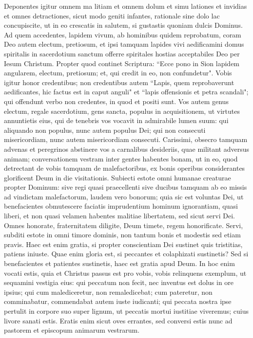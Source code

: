 \begin{biblechapter}  
\verse Deponentes igitur omnem ma litiam et omnem dolum et simu lationes et invidias et omnes detractiones, 
\verse sicut modo geniti infantes, rationale sine dolo lac concupiscite, ut in eo crescatis in salutem, 
\verse si gustastis quoniam dulcis Dominus. 
\verse Ad quem accedentes, lapidem vivum, ab hominibus quidem reprobatum, coram Deo autem electum, pretiosum, 
\verse et ipsi tamquam lapides vivi aedificamini domus spiritalis in sacerdotium sanctum offerre spiritales hostias acceptabiles Deo per Iesum Christum. 
\verse Propter quod continet Scriptura: “Ecce pono in Sion lapidem angularem, electum, pretiosum; et, qui credit in eo, non confundetur". 
\verse Vobis igitur honor credentibus; non credentibus autem “Lapis, quem reprobaverunt aedificantes, hic factus est in caput anguli" 
\verse et “lapis offensionis et petra scandali"; qui offendunt verbo non credentes, in quod et positi sunt. 
\verse Vos autem genus electum, regale sacerdotium, gens sancta, populus in acquisitionem, ut virtutes annuntietis eius, qui de tenebris vos vocavit in admirabile lumen suum: 
\verse qui aliquando non populus, nunc autem populus Dei; qui non consecuti misericordiam, nunc autem misericordiam consecuti. 
\verse Carissimi, obsecro tamquam advenas et peregrinos abstinere vos a carnalibus desideriis, quae militant adversus animam; 
\verse conversationem vestram inter gentes habentes bonam, ut in eo, quod detrectant de vobis tamquam de malefactoribus, ex bonis operibus considerantes glorificent Deum in die visitationis. 
\verse Subiecti estote omni humanae creaturae propter Dominum: sive regi quasi praecellenti 
\verse sive ducibus tamquam ab eo missis ad vindictam malefactorum, laudem vero bonorum; 
\verse quia sic est voluntas Dei, ut benefacientes obmutescere faciatis imprudentium hominum ignorantiam, 
\verse quasi liberi, et non quasi velamen habentes malitiae libertatem, sed sicut servi Dei. 
\verse Omnes honorate, fraternitatem diligite, Deum timete, regem honorificate. 
\verse Servi, subditi estote in omni timore dominis, non tantum bonis et modestis sed etiam pravis. 
\verse Haec est enim gratia, si propter conscientiam Dei sustinet quis tristitias, patiens iniuste. 
\verse Quae enim gloria est, si peccantes et colaphizati sustinetis? Sed si benefacientes et patientes sustinetis, haec est gratia apud Deum. 
\verse In hoc enim vocati estis, quia et Christus passus est pro vobis, vobis relinquens exemplum, ut sequamini vestigia eius: 
\verse qui peccatum non fecit, nec inventus est dolus in ore ipsius; 
\verse qui cum malediceretur, non remaledicebat; cum pateretur, non comminabatur, commendabat autem iuste iudicanti; 
\verse qui peccata nostra ipse pertulit in corpore suo super lignum, ut peccatis mortui iustitiae viveremus; cuius livore sanati estis. 
\verse Eratis enim sicut oves errantes, sed conversi estis nunc ad pastorem et episcopum animarum vestrarum.  
\end{biblechapter}

